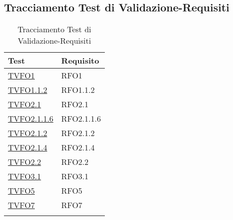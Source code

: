 \subsection{Tracciamento Test di Validazione-Requisiti}
\normalsize
\begin{longtable}{|>{\centering}m{5cm}|m{5cm}<{\centering}|}
\hline 
\textbf{Test} & \textbf{Requisito}\\
\hline
\endhead
\hyperlink{TVFO1}{TVFO1} & RFO1\\ \hline
\hyperlink{TVFO1.1.2}{TVFO1.1.2} & RFO1.1.2\\ \hline
\hyperlink{TVFO2.1}{TVFO2.1} & RFO2.1\\ \hline
\hyperlink{TVFO2.1.1.6}{TVFO2.1.1.6} & RFO2.1.1.6\\ \hline
\hyperlink{TVFO2.1.2}{TVFO2.1.2} & RFO2.1.2\\ \hline
\hyperlink{TVFO2.1.4}{TVFO2.1.4} & RFO2.1.4\\ \hline
\hyperlink{TVFO2.2}{TVFO2.2} & RFO2.2\\ \hline
\hyperlink{TVFO3.1}{TVFO3.1} & RFO3.1\\ \hline
\hyperlink{TVFO5}{TVFO5} & RFO5\\ \hline
\hyperlink{TVFO7}{TVFO7} & RFO7\\ \hline
\caption[Tracciamento Test di Validazione-Requisiti]{Tracciamento Test di Validazione-Requisiti}
\label{tabella:tv-requi}
\end{longtable}
\clearpage
